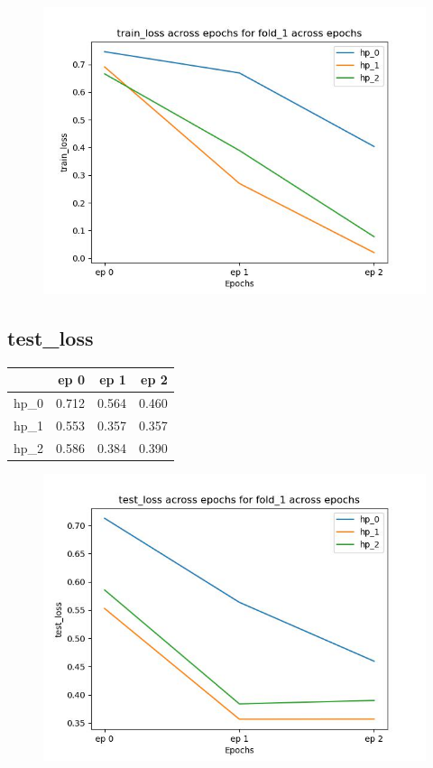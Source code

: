 \documentclass{article}
\begin{document}
\begin{figure}[H]
\includegraphics[scale = 0.75]{fold_1/train_loss}
\end{figure}
\subsection{test\_loss}
\begin{tabular}{lrrr}
\toprule
{} &   ep 0 &   ep 1 &   ep 2 \\
\midrule
hp\_0 &  0.712 &  0.564 &  0.460 \\
hp\_1 &  0.553 &  0.357 &  0.357 \\
hp\_2 &  0.586 &  0.384 &  0.390 \\
\bottomrule
\end{tabular}

\begin{figure}[H]
\includegraphics[scale = 0.75]{fold_1/test_loss}
\end{figure}
\end{document}
